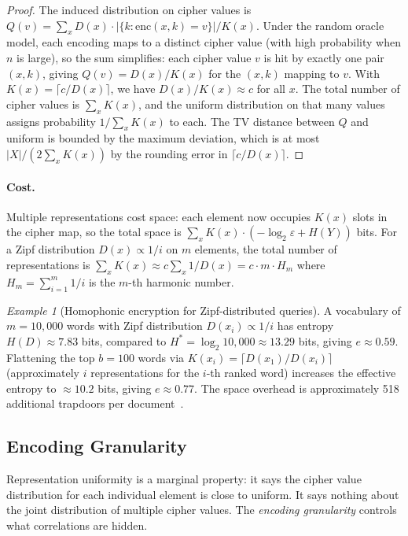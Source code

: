 \documentclass[11pt]{article}
\theoremstyle{definition}
\theoremstyle{plain}
\theoremstyle{remark}
\newtheorem{example}{Example}[section]
\newcommand{\enc}{\mathrm{enc}}
\begin{document}
\begin{proof}
The induced distribution on cipher values is
$Q(v) = \sum_x D(x) \cdot |\{k : \enc(x, k) = v\}| / K(x)$.  Under the
random oracle model, each encoding maps to a distinct cipher value (with
high probability when $n$ is large), so the sum simplifies: each cipher
value $v$ is hit by exactly one pair $(x, k)$, giving
$Q(v) = D(x) / K(x)$ for the $(x, k)$ mapping to $v$.  With
$K(x) = \lceil c / D(x) \rceil$, we have $D(x) / K(x) \approx c$ for all
$x$.  The total number of cipher values is $\sum_x K(x)$, and the uniform
distribution on that many values assigns probability $1 / \sum_x K(x)$ to
each.  The TV distance between $Q$ and uniform is bounded by the maximum
deviation, which is at most $|X| / (2 \sum_x K(x))$ by the rounding error
in $\lceil c / D(x) \rceil$.
\end{proof}

\paragraph{Cost.}
Multiple representations cost space: each element now occupies $K(x)$
slots in the cipher map, so the total space is
$\sum_x K(x) \cdot (-\log_2 \varepsilon + H(Y))$ bits.  For a Zipf
distribution $D(x) \propto 1/i$ on $m$ elements, the total number of
representations is $\sum_x K(x) \approx c \sum_x 1/D(x) = c \cdot m
\cdot H_m$ where $H_m = \sum_{i=1}^m 1/i$ is the $m$-th harmonic
number.

\begin{example}[Homophonic encryption for Zipf-distributed queries]
\label{ex:homophonic}
A vocabulary of $m = 10{,}000$ words with Zipf distribution
$D(x_i) \propto 1/i$ has entropy
$H(D) \approx 7.83$ bits, compared to $H^* = \log_2 10{,}000 \approx
13.29$ bits, giving $e \approx 0.59$.  Flattening the top $b = 100$
words via $K(x_i) = \lceil D(x_1) / D(x_i) \rceil$ (approximately
$i$ representations for the $i$-th ranked word) increases the effective
entropy to $\approx 10.2$ bits, giving $e \approx 0.77$.  The space
overhead is approximately 518 additional trapdoors per
document~\cite{towell2017maxconf}.
\end{example}

\subsection{Encoding Granularity}
\label{subsec:granularity}

Representation uniformity is a marginal property: it says the cipher
value distribution for each individual element is close to uniform.  It
says nothing about the joint distribution of multiple cipher
values.  The \emph{encoding granularity} controls what correlations are
hidden.
\end{document}
